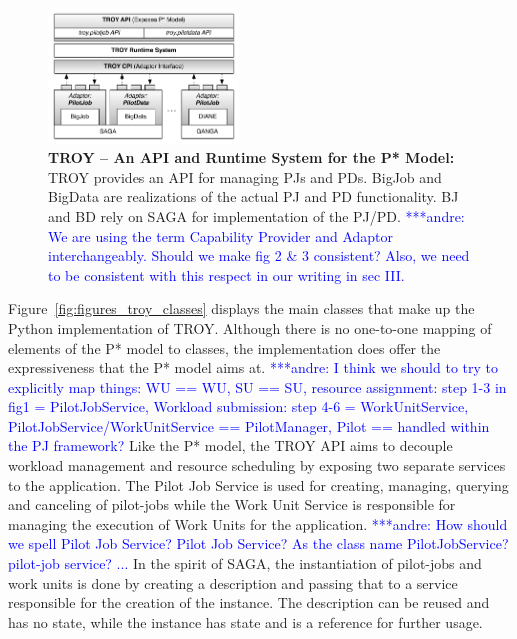 \documentclass[conference,final]{IEEEtran}
\newcommand{\alnote}[1]{ {\textcolor{blue} { ***andre: #1 }}}
\newcommand{\alnote}[1]{}
\begin{document}
\begin{figure}[t]
	\centering
		\includegraphics[width=0.45\textwidth]{figures/TROY_arch.pdf}
                \caption{\textbf{TROY -- An API and Runtime System for
                    the P* Model:} TROY provides an API for managing
                  PJs and PDs. BigJob and BigData are realizations of
                  the actual PJ and PD functionality. BJ and BD rely
                  on SAGA for implementation of the PJ/PD.\alnote{We
                    are using the term Capability Provider and Adaptor
                    interchangeably. Should we make fig 2 \& 3
                    consistent? Also, we need to be consistent with
                    this respect in our writing in sec III.}  }
	\label{fig:figures_pstar_troy}
\end{figure}

Figure~\ref{fig:figures_troy_classes} displays the main classes that
make up the Python implementation of TROY.  Although there is no
one-to-one mapping of elements of the P* model to classes, the
implementation does offer the expressiveness that the P* model aims
at. \alnote{I think we should to try to explicitly map things: WU ==
  WU, SU == SU, resource assignment: step 1-3 in fig1 =
  PilotJobService, Workload submission: step 4-6 = WorkUnitService,
  PilotJobService/WorkUnitService == PilotManager, Pilot == handled
  within the PJ framework?}  Like the P* model, the TROY API aims to
decouple workload management and resource scheduling by exposing two
separate services to the application.  The Pilot Job Service is used
for creating, managing, querying and canceling of pilot-jobs while the
Work Unit Service is responsible for managing the execution of Work
Units for the application. \alnote{How should we spell Pilot Job
  Service? Pilot Job Service? As the class name PilotJobService?
  pilot-job service? ...} In the spirit of SAGA, the instantiation of
pilot-jobs and work units is done by creating a description and
passing that to a service responsible for the creation of the
instance. The description can be reused and has no state, while the
instance has state and is a reference for further usage.
\end{document}
